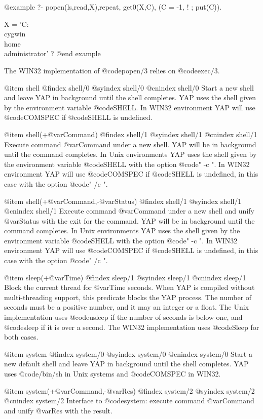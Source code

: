 {{{{{{{{{@example
   ?- popen(ls,read,X),repeat, get0(X,C), (C = -1, ! ; put(C)).

X = 'C:\\cygwin\\home\\administrator' ?
@end example


The WIN32 implementation of @code{popen/3} relies on @code{exec/3}.

@item shell
@findex  shell/0
@syindex shell/0
@cnindex shell/0
Start a new shell and leave YAP in background until the shell
completes. YAP uses the shell given by the environment variable
@code{SHELL}. In WIN32 environment YAP will use @code{COMSPEC} if
@code{SHELL} is undefined.

@item shell(+@var{Command})
@findex  shell/1
@syindex shell/1
@cnindex shell/1
Execute command @var{Command} under a new shell. YAP will be in
background until the command completes. In Unix environments YAP uses
the shell given by the environment variable @code{SHELL} with the option
@code{" -c "}. In WIN32 environment YAP will use @code{COMSPEC} if
@code{SHELL} is undefined, in this case with the option @code{" /c "}.

@item shell(+@var{Command},-@var{Status})
@findex  shell/1
@syindex shell/1
@cnindex shell/1
Execute command @var{Command} under a new shell and unify @var{Status}
with the exit for the command. YAP will be in background until the
command completes. In Unix environments YAP uses the shell given by the
environment variable @code{SHELL} with the option @code{" -c "}. In
WIN32 environment YAP will use @code{COMSPEC} if @code{SHELL} is
undefined, in this case with the option @code{" /c "}.

@item sleep(+@var{Time})
@findex  sleep/1
@syindex sleep/1
@cnindex sleep/1
Block the current thread for @var{Time} seconds. When YAP is compiled 
without multi-threading support, this predicate blocks the YAP process. 
The number of seconds must be a positive number, and it may an integer 
or a float. The Unix implementation uses @code{usleep} if the number of 
seconds is below one, and @code{sleep} if it is over a second. The WIN32 
implementation uses @code{Sleep} for both cases.

@item system
@findex  system/0
@syindex system/0
@cnindex system/0
Start a new default shell and leave YAP in background until the shell
completes. YAP uses @code{/bin/sh} in Unix systems and @code{COMSPEC} in
WIN32.

@item system(+@var{Command},-@var{Res})
@findex  system/2
@syindex system/2
@cnindex system/2
Interface to @code{system}: execute command @var{Command} and unify
@var{Res} with the result.

}}}}}}}}}
